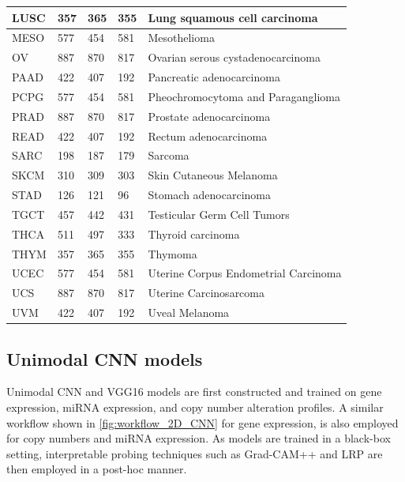 \begin{table} [h]
\begin{tabular}{l|l|l|l|l}
            LUSC & 357 & 365 & 355 & Lung squamous cell carcinoma \\\hline
            MESO & 577 & 454 & 581 & Mesothelioma \\\hline
            OV   & 887 & 870 & 817 & Ovarian serous cystadenocarcinoma  \\\hline
            PAAD & 422 & 407 & 192 & Pancreatic adenocarcinoma \\\hline
            PCPG   & 577 & 454 & 581 & Pheochromocytoma and Paraganglioma \\\hline
            PRAD & 887 & 870 & 817 & Prostate adenocarcinoma  \\\hline
            READ & 422 & 407 & 192 & Rectum adenocarcinoma \\\hline
            SARC & 198 & 187 & 179 & Sarcoma	\\\hline%
            SKCM & 310 & 309 & 303 & Skin Cutaneous Melanoma \\\hline 
            STAD & 126 & 121 & 96 & Stomach adenocarcinoma \\\hline 
            TGCT & 457 & 442 & 431 & Testicular Germ Cell Tumors  \\\hline
            THCA & 511 & 497 & 333 & Thyroid carcinoma \\\hline
            THYM & 357 & 365 & 355 & Thymoma \\\hline
            UCEC   & 577 & 454 & 581 & Uterine Corpus Endometrial Carcinoma \\\hline
            UCS & 887 & 870 & 817 & Uterine Carcinosarcoma  \\\hline
            UVM & 422 & 407 & 192 & Uveal Melanoma \\\hline
    \end{tabular}
    \vspace{-2mm}
\end{table}

\subsection{Unimodal CNN models}
Unimodal CNN and VGG16 models are first constructed and trained on gene expression, miRNA expression, and copy number alteration profiles. A similar workflow shown in \cref{fig:workflow_2D_CNN} for gene expression, is also employed for copy numbers and miRNA expression. As models are trained in a black-box setting, interpretable probing techniques such as Grad-CAM++ and LRP are then employed in a post-hoc manner. 

